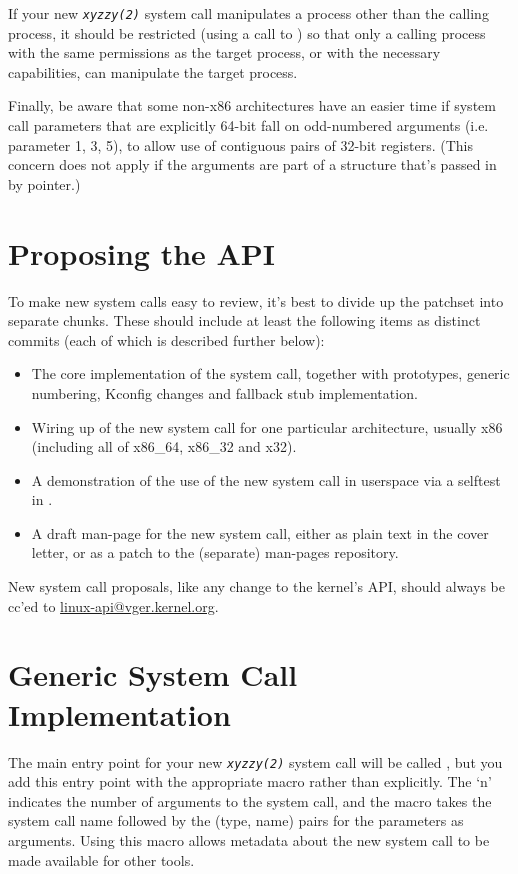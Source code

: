 \documentclass[a4paper,8pt,english]{sphinxmanual}
\begin{document}
If your new \emph{\texttt{xyzzy(2)}} system call manipulates a process other than
the calling process, it should be restricted (using a call to
) so that only a calling process with the same
permissions as the target process, or with the necessary capabilities, can
manipulate the target process.

Finally, be aware that some non-x86 architectures have an easier time if
system call parameters that are explicitly 64-bit fall on odd-numbered
arguments (i.e. parameter 1, 3, 5), to allow use of contiguous pairs of 32-bit
registers.  (This concern does not apply if the arguments are part of a
structure that's passed in by pointer.)


\section{Proposing the API}
\label{process/adding-syscalls:proposing-the-api}
To make new system calls easy to review, it's best to divide up the patchset
into separate chunks.  These should include at least the following items as
distinct commits (each of which is described further below):
\begin{itemize}
\item {} 
The core implementation of the system call, together with prototypes,
generic numbering, Kconfig changes and fallback stub implementation.

\item {} 
Wiring up of the new system call for one particular architecture, usually
x86 (including all of x86\_64, x86\_32 and x32).

\item {} 
A demonstration of the use of the new system call in userspace via a
selftest in .

\item {} 
A draft man-page for the new system call, either as plain text in the
cover letter, or as a patch to the (separate) man-pages repository.

\end{itemize}

New system call proposals, like any change to the kernel's API, should always
be cc'ed to \href{mailto:linux-api@vger.kernel.org}{linux-api@vger.kernel.org}.


\section{Generic System Call Implementation}
\label{process/adding-syscalls:generic-system-call-implementation}
The main entry point for your new \emph{\texttt{xyzzy(2)}} system call will be called
, but you add this entry point with the appropriate
 macro rather than explicitly.  The `n' indicates the
number of arguments to the system call, and the macro takes the system call name
followed by the (type, name) pairs for the parameters as arguments.  Using
this macro allows metadata about the new system call to be made available for
other tools.
\end{document}

